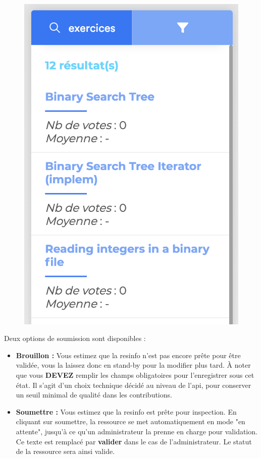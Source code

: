 \begin{figure}[H]
    \includegraphics[width=\textwidth,height=0.3\textheight,keepaspectratio]{images/client/similarity.png}
    \centering
\end{figure}


Deux options de soumission sont disponibles :

\begin{itemize}
    \item \textbf{Brouillon :} Vous estimez que la \gls{resinfo} n'est pas encore prête pour être validée, vous la laissez donc en stand-by pour la modifier plus tard. À noter que vous \textbf{DEVEZ} remplir les champs obligatoires pour l'enregistrer sous cet état. Il s'agit d'un choix technique décidé au niveau de l'\gls{api}, pour conserver un seuil minimal de qualité dans les contributions.
    \item \textbf{Soumettre :} Vous estimez que la \gls{resinfo} est prête pour inspection. En cliquant sur soumettre, la ressource se met automatiquement en mode "en attente", jusqu'à ce qu'un administrateur la prenne en charge pour validation. Ce texte est remplacé par \textbf{valider} dans le cas de l'administrateur. Le statut de la ressource sera ainsi valide.
\end{itemize}

